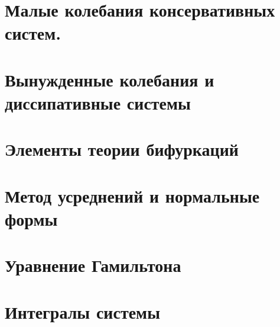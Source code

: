 


\section{Малые колебания консервативных систем.}


\section{Вынужденные колебания и диссипативные системы}


\section{Элементы теории бифуркаций}


\section{Метод усреднений и нормальные формы}


\section{Уравнение Гамильтона}


\section{Интегралы системы}


